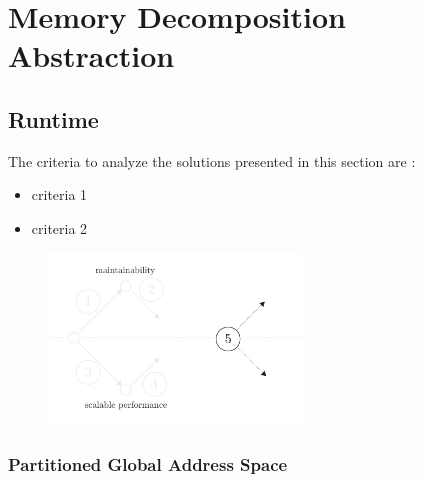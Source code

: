\section{Memory Decomposition Abstraction}





\subsection{Runtime}

The criteria to analyze the solutions presented in this section are :
\begin{itemize}
\item criteria 1
\item criteria 2
\end{itemize}


\begin{figure}[h!]
\begin{center}
\includegraphics[width=0.6\textwidth]{../ressources/state-of-the-art-5.pdf}
\end{center}
\end{figure}





\subsubsection{Partitioned Global Address Space}

